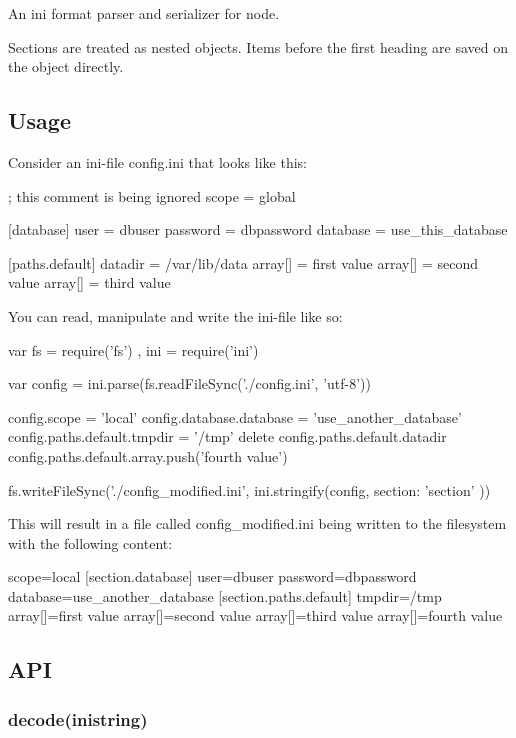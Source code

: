 An ini format parser and serializer for node.

Sections are treated as nested objects. Items before the first heading are saved on the object directly.

\subsection*{Usage}

Consider an ini-\/file {\ttfamily config.\+ini} that looks like this\+: \begin{DoxyVerb}; this comment is being ignored
scope = global

[database]
user = dbuser
password = dbpassword
database = use_this_database

[paths.default]
datadir = /var/lib/data
array[] = first value
array[] = second value
array[] = third value
\end{DoxyVerb}


You can read, manipulate and write the ini-\/file like so\+: \begin{DoxyVerb}var fs = require('fs')
  , ini = require('ini')

var config = ini.parse(fs.readFileSync('./config.ini', 'utf-8'))

config.scope = 'local'
config.database.database = 'use_another_database'
config.paths.default.tmpdir = '/tmp'
delete config.paths.default.datadir
config.paths.default.array.push('fourth value')

fs.writeFileSync('./config_modified.ini', ini.stringify(config, { section: 'section' }))
\end{DoxyVerb}


This will result in a file called {\ttfamily config\+\_\+modified.\+ini} being written to the filesystem with the following content\+: \begin{DoxyVerb}[section]
scope=local
[section.database]
user=dbuser
password=dbpassword
database=use_another_database
[section.paths.default]
tmpdir=/tmp
array[]=first value
array[]=second value
array[]=third value
array[]=fourth value
\end{DoxyVerb}


\subsection*{A\+P\+I}

\subsubsection*{decode(inistring)}

